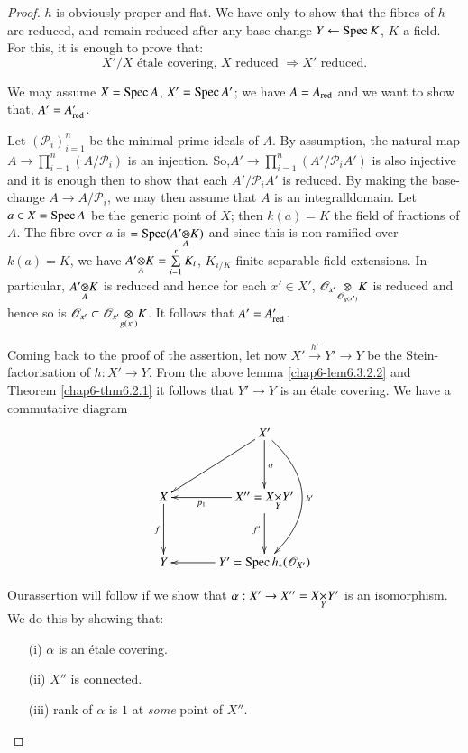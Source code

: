 \begin{proof}
$h$ is obviously proper and flat. We have only to show that the fibres
  of $h$ are reduced, and remain reduced after any base-change
  $Y\leftarrow \operatorname{Spec} K$, $K$ a field. For this, it is enough to prove
  that:
$$
X'/X\text{\ \'etale covering, $X$ reduced $\Rightarrow X'$ reduced.}
$$

We may assume $X=\operatorname{Spec} A$, $X'=\operatorname{Spec} A'$; we have $A=A_{\operatorname{red}}$ and we
want to show that, $A'=A'_{\operatorname{red}}$. 

Let $(\mathscr{P}_{i})^{n}_{i=1}$ be the minimal prime ideals of
$A$. By assumption, the natural map $A\to
\prod\limits^{n}_{i=1}(A/\mathscr{P}_{i})$ is an
injection. So,\pageoriginale $A'\to
\prod\limits^{n}_{i=1}(A'/\mathscr{P}_{i}A')$ is also injective and it
is enough then to show that each $A'/\mathscr{P}_{i}A'$ is reduced. By
making the base-change $A\to A/\mathscr{P}_{i}$, we may then assume
that $A$ is an integralldomain. Let $a\in X=\operatorname{Spec} A$ be the generic
point of $X$; then $k(a)=K$ the field of fractions of $A$. The fibre
over $a$ is $=\Spec(\foprod{A'}{K}{A})$ and since this is non-ramified
over $k(a)=K$, we have $\foprod{A'}{K}{A}=\sum\limits^{r}_{i=1}K_{i}$,
$K_{i/K}$ finite separable field extensions. In particular,
$\foprod{A'}{K}{A}$ is reduced and hence for each $x'\in X'$,
$\foprod{\mathscr{O}_{x'}}{K}{\mathscr{O}_{g(x')}}$ is reduced and
hence so is $\mathscr{O}_{x'}\subset
\foprod{\mathscr{O}_{x'}}{K}{g(x')}$. It follows that $A'=A'_{\operatorname{red}}$.

Coming back to the proof of the assertion, let now
$X'\xrightarrow{h'}Y'\to Y$ be the Stein-factorisation of $h:X'\to
Y$. From the above lemma \ref{chap6-lem6.3.2.2} and Theorem
\ref{chap6-thm6.2.1} it 
follows that $Y'\to Y$ is an \'etale covering. We have a commutative
diagram 
\[
\xymatrix@=1.2cm{
 & X'\ar[d]^{\alpha} \ar@/^2.5pc/[dd]^{h'}\ar[dl]\\
X\ar[d]_{f} & X''=\fprod{X}{Y'}{Y}\ar[l]^-{p_{1}}\ar[d]_{f'}\\
Y & Y'=\Spec h_{\ast}(\mathscr{O}_{X'})\ar[l]
}
\]

Our\pageoriginale assertion will follow if we show that $\alpha:X'\to
X''=\fprod{X}{Y'}{Y}$ is an isomorphism. We do this by showing that:
\begin{itemize}
\item[(i)] $\alpha$ is an \'etale covering.

\item[(ii)] $X''$ is connected.

\item[(iii)] rank of $\alpha$ is $1$ at {\em some} point of $X''$.
\end{itemize}


\end{proof}
